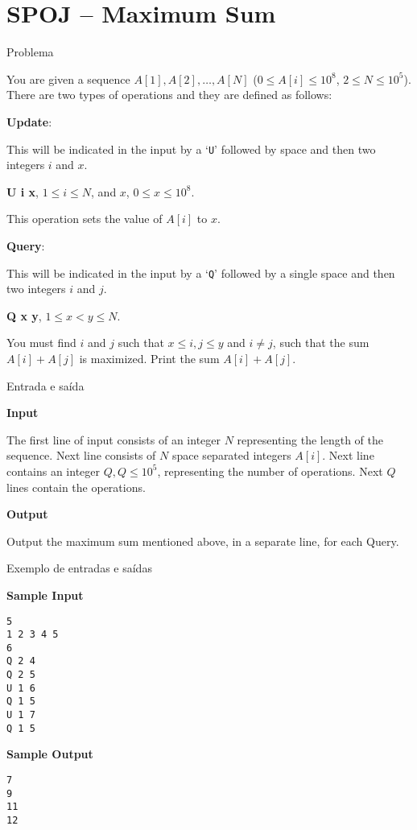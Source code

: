\section{SPOJ -- Maximum Sum}

\begin{frame}[fragile]{Problema}

You are given a sequence $A[1], A[2], \ldots, A[N]$ ($0 \leq A[i] \leq 10^8$, $2 \leq N \leq 10^5$).
There are two types of operations and they are defined as follows:

\textbf{Update}:

This will be indicated in the input by a `\texttt{U}' followed by space and then two integers 
$i$ and $x$.

\textbf{U i x}, $1 \leq i \leq N$, and $x$, $0 \leq x \leq 10^8$.

This operation sets the value of $A[i]$ to $x$.

\textbf{Query}:

This will be indicated in the input by a `\texttt{Q}' followed by a single space and then two 
integers $i$ and $j$.

\textbf{Q x y}, $1 \leq x < y \leq N$.

You must find $i$ and $j$ such that $x \leq i, j \leq y$ and $i \neq j$, such that the sum 
$A[i]+A[j]$ is maximized. Print the sum $A[i]+A[j]$.

\end{frame}

\begin{frame}[fragile]{Entrada e saída}

\textbf{Input}

The first line of input consists of an integer $N$ representing the length of the sequence. Next 
line consists of $N$ space separated integers $A[i]$. Next line contains an integer 
$Q, Q \leq 10^5$, representing the number of operations. Next $Q$ lines contain the operations.

\textbf{Output}

Output the maximum sum mentioned above, in a separate line, for each Query.

\end{frame}

\begin{frame}[fragile]{Exemplo de entradas e saídas}

\begin{minipage}[t]{0.5\textwidth}
\textbf{Sample Input}
\begin{verbatim}
5
1 2 3 4 5
6
Q 2 4
Q 2 5
U 1 6
Q 1 5
U 1 7
Q 1 5
\end{verbatim}
\end{minipage}
\begin{minipage}[t]{0.45\textwidth}
\textbf{Sample Output}
\begin{verbatim}
7
9
11
12
\end{verbatim}
\end{minipage}
\end{frame}

